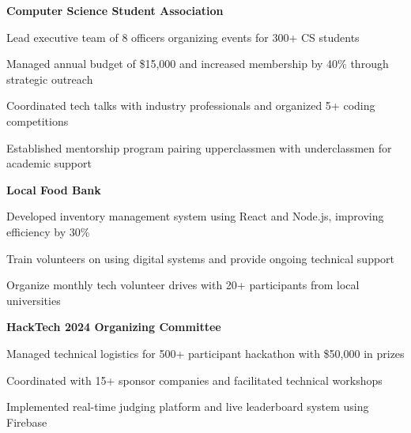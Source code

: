 \noindent\textbf{Computer Science Student Association} \\
 
\begin{tightitemize}
  \item Lead executive team of 8 officers organizing events for 300+ CS students
  \item Managed annual budget of \$15,000 and increased membership by 40\% through strategic outreach
  \item Coordinated tech talks with industry professionals and organized 5+ coding competitions
  \item Established mentorship program pairing upperclassmen with underclassmen for academic support
\end{tightitemize}

\vspace{0.3em}
\noindent\textbf{Local Food Bank} \\
 
\begin{tightitemize}
  \item Developed inventory management system using React and Node.js, improving efficiency by 30\%
  \item Train volunteers on using digital systems and provide ongoing technical support
  \item Organize monthly tech volunteer drives with 20+ participants from local universities
\end{tightitemize}

\vspace{0.3em}
\noindent\textbf{HackTech 2024 Organizing Committee} \\
 
\begin{tightitemize}
  \item Managed technical logistics for 500+ participant hackathon with \$50,000 in prizes
  \item Coordinated with 15+ sponsor companies and facilitated technical workshops
  \item Implemented real-time judging platform and live leaderboard system using Firebase
\end{tightitemize}